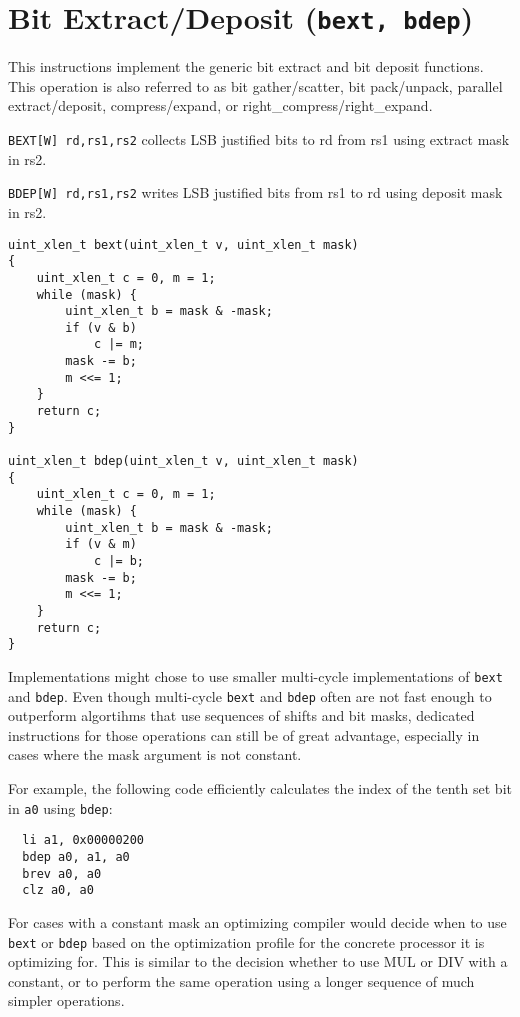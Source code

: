 \section{Bit Extract/Deposit (\texttt{bext,\ bdep})}

This instructions implement the generic bit extract and bit deposit functions.
This operation is also referred to as bit gather/scatter, bit pack/unpack,
parallel extract/deposit, compress/expand, or right\_compress/right\_expand.

\texttt{BEXT[W] rd,rs1,rs2} collects LSB justified bits to rd from
rs1 using extract mask in rs2.

\texttt{BDEP[W] rd,rs1,rs2} writes LSB justified bits from rs1 to rd using
deposit mask in rs2.

\begin{verbatim}
uint_xlen_t bext(uint_xlen_t v, uint_xlen_t mask)
{
    uint_xlen_t c = 0, m = 1;
    while (mask) {
        uint_xlen_t b = mask & -mask;
        if (v & b)
            c |= m;
        mask -= b;
        m <<= 1;
    }
    return c;
}

uint_xlen_t bdep(uint_xlen_t v, uint_xlen_t mask)
{
    uint_xlen_t c = 0, m = 1;
    while (mask) {
        uint_xlen_t b = mask & -mask;
        if (v & m)
            c |= b;
        mask -= b;
        m <<= 1;
    }
    return c;
}
\end{verbatim}

Implementations might chose to use smaller multi-cycle implementations of
\texttt{bext} and \texttt{bdep}. Even though multi-cycle \texttt{bext} and
\texttt{bdep} often are not fast enough to outperform algortihms that use
sequences of shifts and bit masks, dedicated instructions for those operations
can still be of great advantage, especially in cases where the mask argument
is not constant.

For example, the following code efficiently calculates the index of the tenth
set bit in {\tt a0} using \texttt{bdep}:

\begin{verbatim}
  li a1, 0x00000200
  bdep a0, a1, a0
  brev a0, a0
  clz a0, a0
\end{verbatim}

For cases with a constant mask an optimizing compiler would decide when to use
\texttt{bext} or \texttt{bdep} based on the optimization profile for the
concrete processor it is optimizing for. This is similar to the decision
whether to use MUL or DIV with a constant, or to perform the same operation
using a longer sequence of much simpler operations.

